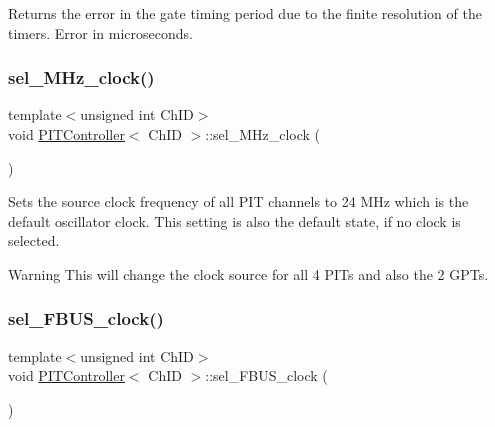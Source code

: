 Returns the error in the gate timing period due to the finite resolution of the timers.  Error in microseconds. 

\mbox{\label{classPITController_adb0d04fa23f4ebd20d2f495a86af3ccd}} 
\subsubsection{\texorpdfstring{sel\+\_\+M\+Hz\+\_\+clock()}{sel\_24MHz\_clock()}}
{\footnotesize\ttfamily template$<$unsigned int Ch\+ID$>$ \\
void \hyperlink{classPITController}{P\+I\+T\+Controller}$<$ Ch\+ID $>$\+::sel\+\_\+M\+Hz\+\_\+clock (\begin{DoxyParamCaption}{ }\end{DoxyParamCaption})\hspace{0.3cm}{\ttfamily [inline]}}



Sets the source clock frequency of all P\+IT channels to 24 M\+Hz which is the default oscillator clock. This setting is also the default state, if no clock is selected. 

\begin{DoxyWarning}{Warning}
This will change the clock source for all 4 P\+I\+Ts and also the 2 G\+P\+Ts. 
\end{DoxyWarning}
\mbox{\label{classPITController_a63e67e2ebfd6ceb5f5e38d9bd6a54754}} 
\subsubsection{\texorpdfstring{sel\+\_\+\+F\+B\+U\+S\+\_\+clock()}{sel\_FBUS\_clock()}}
{\footnotesize\ttfamily template$<$unsigned int Ch\+ID$>$ \\
void \hyperlink{classPITController}{P\+I\+T\+Controller}$<$ Ch\+ID $>$\+::sel\+\_\+\+F\+B\+U\+S\+\_\+clock (\begin{DoxyParamCaption}{ }\end{DoxyParamCaption})\hspace{0.3cm}{\ttfamily [inline]}}



